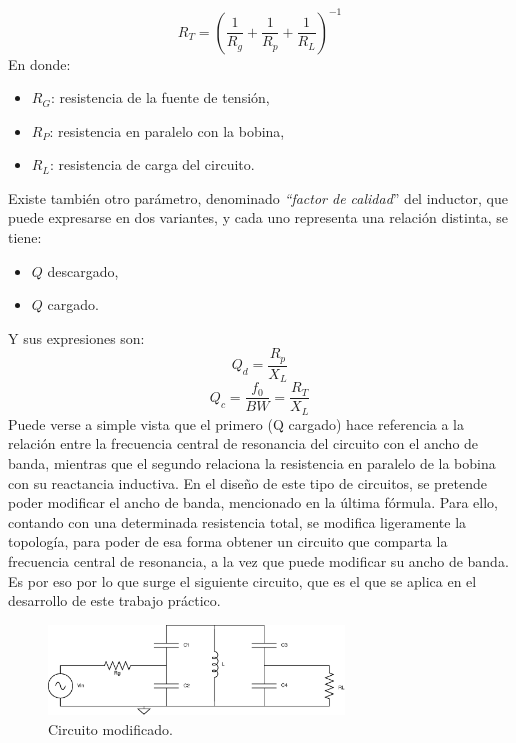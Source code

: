 \documentclass{article}
\begin{document}
\begin{equation*}
    R_T = \left( \frac{1}{R_g} + \frac{1}{R_p} + \frac{1}{R_L} \right)^{-1}
\end{equation*}
\newpage
\noindent En donde:
\begin{itemize}
    \item $R_G$: resistencia de la fuente de tensión,
    \item $R_P$: resistencia en paralelo con la bobina,
    \item $R_L$: resistencia de carga del circuito.
\end{itemize}
Existe también otro parámetro, denominado \textit{“factor de calidad}” del inductor, que puede expresarse en dos variantes, y cada uno representa una relación distinta, se tiene:
\begin{itemize}
    \item $Q$ descargado,
    \item $Q$ cargado.
\end{itemize}
\noindent Y sus expresiones son:
\begin{equation*}
    Q_d = \frac{R_p}{X_L}
\end{equation*}
\begin{equation*}
    Q_c = \frac{f_0}{BW} = \frac{R_T}{X_L}
\end{equation*}
\noindent Puede verse a simple vista que el primero (Q cargado) hace referencia a la relación entre la frecuencia central de resonancia del circuito con el ancho de banda, mientras que el segundo relaciona la resistencia en paralelo de la bobina con su reactancia inductiva.
En el diseño de este tipo de circuitos, se pretende poder modificar el ancho de banda, mencionado en la última fórmula. Para ello, contando con una determinada resistencia total, se modifica ligeramente la topología, para poder de esa forma obtener un circuito que comparta la frecuencia central de resonancia, a la vez que puede modificar su ancho de banda. Es por eso por lo que surge el siguiente circuito, que es el que se aplica en el desarrollo de este trabajo práctico.
\begin{figure}[H]
\centering
\includegraphics[width=0.7\textwidth]{./img/figura2.eps}
\caption{Circuito modificado.}
\label{fig:circuito2}
\end{figure}
\end{document}
